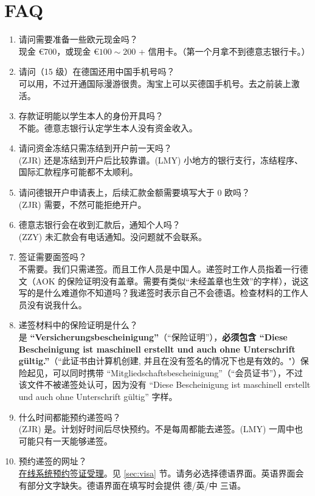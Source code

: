 \documentclass[final]{book}
\begin{document}
\chapter{FAQ}
\begin{enumerate}
  \item 请问需要准备一些欧元现金吗？ \\
  现金 \euro{700}，或现金 \euro{$100 \sim 200$} + 信用卡。（第一个月拿不到德意志银行卡。）
  \item 请问（15 级）在德国还用中国手机号吗？ \\
  可以用，不过开通国际漫游很贵。淘宝上可以买德国手机号。去之前装上激活。
  \item 存款证明能以学生本人的身份开具吗？ \\
  不能。德意志银行认定学生本人没有资金收入。
  \item 请问资金冻结只需冻结到开户前一天吗？ \\
  (ZJR) 还是冻结到开户后比较靠谱。(LMY) 小地方的银行支行，冻结程序、国际汇款程序可能都不太顺利。
  \item 请问德银开户申请表上，后续汇款金额需要填写大于 0 欧吗？ \\
  (ZJR) 需要，不然可能拒绝开户。
  \item 德意志银行会在收到汇款后，通知个人吗？ \\
  (ZZY) 未汇款会有电话通知。没问题就不会联系。
  \item 签证需要面签吗？ \\
  不需要。我们只需递签。而且工作人员是中国人。递签时工作人员指着一行德文（AOK 的保险证明没有盖章。需要有类似“未经盖章也生效”的字样），说这写的是什么难道你不知道吗？我递签时表示自己不会德语。检查材料的工作人员没有说我什么。
  \item 递签材料中的保险证明是什么？ \\
  是 \textbf{``Versicherungsbescheinigung''}（“保险证明”），\textbf{必须包含 ``Diese Bescheinigung ist maschinell erstellt und auch ohne Unterschrift gültig.''}（“此证书由计算机创建, 并且在没有签名的情况下也是有效的。"）{\color{gray}保险起见，可以同时携带 ``Mitgliedschaftsbescheinigung''（“会员证书”），不过该文件不被递签处认可，因为没有 ``Diese Bescheinigung ist maschinell erstellt und auch ohne Unterschrift gültig'' 字样。}
  \item 什么时间都能预约递签吗？ \\
  (ZJR) 是。计划好时间后尽快预约。不是每周都能去递签。(LMY) 一周中也可能只有一天能够递签。
  \item 预约递签的网址？ \\
  \href{https://service2.diplo.de/rktermin/extern/choose_category.do?locationCode=peki&realmId=12&categoryId=156&request_locale=de}{在线系统预约签证受理}。见 \ref{sec:visa} 节。请务必选择德语界面。英语界面会有部分文字缺失。德语界面在填写时会提供 德/英/中 三语。
\end{enumerate}
\end{document}
